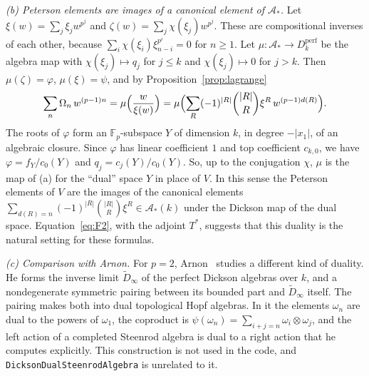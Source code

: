 \documentclass[11pt]{amsart}
\theoremstyle{definition}
\theoremstyle{remark}
\newcommand{\F}{\mathbb{F}_p}
\newcommand{\A}{\mathcal{A}}
\newcommand{\Dperf}{D_k^{\mathrm{perf}}}
\newcommand{\code}[1]{\texttt{#1}}
\begin{document}
\emph{(b) Peterson elements are images of a canonical element of $\A_*$.}  Let
$\xi(w)=\sum_j\xi_jw^{p^j}$ and $\zeta(w)=\sum_j\chi(\xi_j)w^{p^j}$.  These
are compositional inverses of each other, because
$\sum_i\chi(\xi_i)\xi_{n-i}^{p^i}=0$ for $n\ge1$.  Let
$\mu\colon\A_*\to\Dperf$ be the algebra map with $\chi(\xi_j)\mapsto q_j$ for
$j\le k$ and $\chi(\xi_j)\mapsto0$ for $j>k$.  Then $\mu(\zeta)=\varphi$,
$\mu(\xi)=\psi$, and by Proposition~\ref{prop:lagrange}
\[
  \sum_n\Omega_n\,w^{(p-1)n}=\mu\Bigl(\frac{w}{\xi(w)}\Bigr)
  =\mu\Bigl(\sum_R(-1)^{|R|}\binom{|R|}{R}\xi^R\,w^{(p-1)d(R)}\Bigr).
\]
The roots of $\varphi$ form an $\F$-subspace $Y$ of dimension $k$, in degree
$-|x_1|$, of an algebraic closure.  Since $\varphi$ has linear coefficient $1$
and top coefficient $c_{k,0}$, we have $\varphi=f_Y/c_0(Y)$ and
$q_j=c_j(Y)/c_0(Y)$.  So, up to the conjugation $\chi$, $\mu$ is the map of (a)
for the ``dual'' space $Y$ in place of $V$.  In this sense the Peterson elements of $V$ are the images of the
canonical elements $\sum_{d(R)=n}(-1)^{|R|}\binom{|R|}{R}\xi^R\in\A_*(k)$ under
the Dickson map of the dual space.  Equation~\eqref{eq:F2}, with the adjoint
$T^*$, suggests that this duality is the natural setting for these
formulas.

\emph{(c) Comparison with Arnon.}  For $p=2$, Arnon~\cite[\S\S4--5]{Arnon}
studies a different kind of duality.  He forms the inverse limit
$\widetilde D_\infty$ of the perfect Dickson algebras over $k$, and a
nondegenerate symmetric pairing between its bounded part and
$\widetilde D_\infty$ itself.  The pairing makes both into dual topological
Hopf algebras.  In it the elements $\omega_n$ are dual to the powers of
$\omega_1$, the coproduct is $\psi(\omega_n)=\sum_{i+j=n}\omega_i\otimes\omega_j$,
and the left action of a completed Steenrod algebra is dual to a right action
that he computes explicitly.  This construction is not used in the code, and
\code{DicksonDualSteenrodAlgebra} is unrelated to it.
\end{document}
